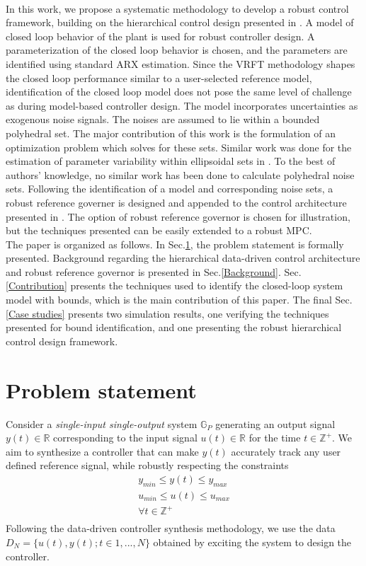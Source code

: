 \documentclass[letterpaper, 10 pt, conference]{ieeeconf}  %
\begin{document}
\\ \indent
In this work, we propose a systematic methodology to develop a robust control framework, building on the hierarchical control design presented in \cite{7932940}. A model of closed loop behavior of the plant is used for robust controller design. A parameterization of the closed loop behavior is chosen, and the parameters are identified using standard ARX estimation. Since the VRFT methodology shapes the closed loop performance similar to a user-selected reference model, identification of the closed loop model does not pose the same level of challenge as during model-based controller design.
 The model incorporates uncertainties as exogenous noise signals. The noises are assumed to lie within a bounded polyhedral set. The major contribution of this work is the formulation of an optimization problem which solves for these sets. Similar work was done for the estimation of parameter variability within ellipsoidal sets in \cite{7330793}. To the best of authors' knowledge, no similar work has been done to calculate polyhedral noise sets. Following the identification of a model and corresponding noise sets, a robust reference governer is designed and appended to the control architecture presented in \cite{7330793}.
 The option of robust reference governor is chosen for illustration, but the techniques presented can be easily extended to a robust MPC.
 \\ \indent
 The paper is organized as follows. In Sec.\ref{Problem statement}, the problem statement is formally presented. Background regarding the hierarchical data-driven control architecture and robust reference governor is presented in Sec.\ref{Background}. Sec.\ref{Contribution} presents the techniques used to identify the closed-loop system model with bounds, which is the main contribution of this paper. The final Sec.\ref{Case studies} presents two simulation results, one verifying the techniques presented for bound identification, and one presenting the robust hierarchical control design framework. 

\section{Problem statement}
\label{Problem statement}
Consider a \textit{single-input single-output} system $\mathbb{G}_P$ generating an output signal $y(t) \in \mathbb{R}$ corresponding to the input signal $u(t) \in \mathbb{R}$ for the time $t \in \mathbb{Z}^+$. We aim to synthesize a controller that can make $y(t)$ accurately track any user defined reference signal, while robustly respecting the constraints
\begin{equation*} 
\begin{matrix}
y_{min}\leq y(t) \leq y_{max}\\
u_{min}\leq u(t) \leq u_{max} \\
\forall t \in \mathbb{Z}^+\\
\end{matrix}
\end{equation*} 
Following the data-driven controller synthesis methodology, we use the data $D_{N}=\{u(t),y(t);t\in{1,...,N}\}$ obtained by exciting the system to design the controller.
\end{document}
